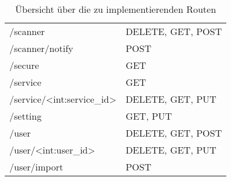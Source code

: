 \begin{table}
\begin{tabular}{l l}
		/scanner								 & DELETE, GET, POST \\
		/scanner/notify							 & POST \\
		/secure									 & GET \\
		/service								 & GET \\
		/service/<int:service\_id>				 & DELETE, GET, PUT \\
		/setting								 & GET, PUT \\
		/user									 & DELETE, GET, POST \\
		/user/<int:user\_id>					 & DELETE, GET, PUT \\
		/user/import							 & POST \\
	\end{tabular}
	\caption{Übersicht über die zu implementierenden Routen}
	\label{table:gis-routes}
\end{table}